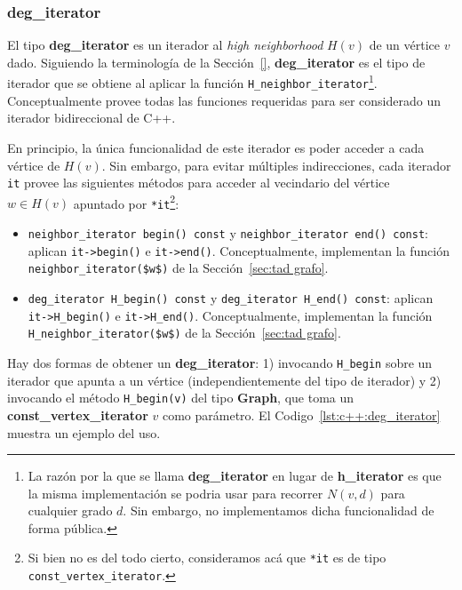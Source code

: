 \documentclass[%
    a4paper,%
    12pt,%
    twoside,%
    openright,%
    halfparskip,%
    cleardoubleempty,%
    bigheadings,%
    titlepage,%
    headsepline%
]{scrbook}
\makeatletter
\newcommand{\Code}[1]{\lstinline[basicstyle={\tt}]@#1@}
\makeatother
\begin{document}
\subsubsection{deg\_iterator}
\label{sec:deg_iterator}

El tipo \textbf{deg\_iterator} es un iterador al \emph{high neighborhood} $H(v)$ de un vértice $v$ dado.  Siguiendo la terminología de la Sección~\ref{}, \textbf{deg\_iterator} es el tipo de iterador que se obtiene al aplicar la función \Code{H_neighbor_iterator}\footnote{La razón por la que se llama \textbf{deg\_iterator} en lugar de \textbf{h\_iterator} es que la misma implementación se podria usar para recorrer $N(v, d)$ para cualquier grado $d$.  Sin embargo, no implementamos dicha funcionalidad de forma pública.}.  Conceptualmente provee todas las funciones requeridas para ser considerado un iterador bidireccional de C++.

En principio, la única funcionalidad de este iterador es poder acceder a cada vértice de $H(v)$.  Sin embargo, para evitar múltiples indirecciones, cada iterador \Code{it} provee las siguientes métodos para acceder al vecindario del vértice $w \in H(v)$ apuntado por \Code{*it}\footnote{Si bien no es del todo cierto, consideramos acá que \Code{*it} es de tipo \Code{const_vertex_iterator}.}:
\begin{itemize}
  \item \Code{neighbor_iterator begin() const} y \Code{neighbor_iterator end() const}: aplican \Code{it->begin()} e \Code{it->end()}.   Conceptualmente, implementan la función \Code{neighbor_iterator($w$)} de la Sección~\ref{sec:tad grafo}.
  \item \Code{deg_iterator H_begin() const} y \Code{deg_iterator H_end() const}: aplican \Code{it->H_begin()} e \Code{it->H_end()}. Conceptualmente, implementan la función \Code{H_neighbor_iterator($w$)} de la Sección~\ref{sec:tad grafo}.  
\end{itemize}

Hay dos formas de obtener un \textbf{deg\_iterator}: 1) invocando \Code{H_begin} sobre un iterador que apunta a un vértice (independientemente del tipo de iterador) y 2) invocando el método \Code{H_begin(v)} del tipo \textbf{Graph}, que toma un \textbf{const\_vertex\_iterator} $v$ como parámetro.  El Codigo~\ref{lst:c++:deg_iterator} muestra un ejemplo del uso.
\end{document}
